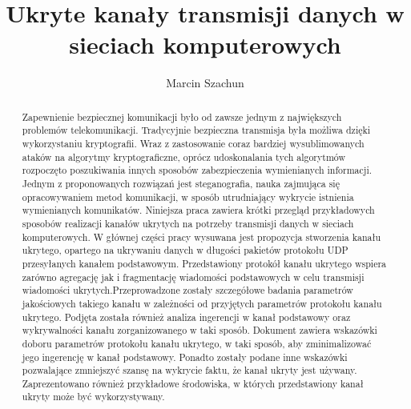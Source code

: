 \documentclass[a4paper, twoside]{report}
\begin{document}
\title{Ukryte kanały transmisji danych w sieciach komputerowych}
\author{Marcin Szachun}
\maketitle


\begin{abstract}
    Zapewnienie bezpiecznej komunikacji było od zawsze jednym z największych
    problemów telekomunikacji. Tradycyjnie bezpieczna transmisja była możliwa
    dzięki wykorzystaniu kryptografii. Wraz z zastosowanie coraz bardziej wysublimowanych
    ataków na algorytmy kryptograficzne, oprócz udoskonalania tych algorytmów rozpoczęto
    poszukiwania innych sposobów zabezpieczenia wymienianych informacji. Jednym
    z proponowanych rozwiązań jest steganografia, nauka zajmująca się opracowywaniem
    metod komunikacji, w sposób utrudniający wykrycie istnienia wymienianych komunikatów.
    Niniejsza praca zawiera krótki przegląd przykładowych sposobów
    realizacji kanałów ukrytych na potrzeby transmisji danych w sieciach komputerowych.
    W głównej części pracy wysuwana jest propozycja stworzenia kanału ukrytego, opartego na ukrywaniu
    danych w długości pakietów protokołu UDP przesyłanych kanałem podstawowym.
    Przedstawiony protokół kanału ukrytego wspiera zarówno agregację jak i fragmentację
    wiadomości podstawowych w celu transmisji wiadomości ukrytych.Przeprowadzone
    zostały szczegółowe badania parametrów jakościowych takiego kanału w zależności
    od przyjętych parametrów protokołu kanału ukrytego. Podjęta została również
    analiza ingerencji w kanał podstawowy oraz wykrywalności kanału zorganizowanego w taki sposób.
    Dokument zawiera wskazówki doboru parametrów protokołu kanału ukrytego, w taki sposób, aby
    zminimalizować jego ingerencję w kanał podstawowy. Ponadto zostały podane inne
    wskazówki pozwalające zmniejszyć szansę na wykrycie faktu, że kanał ukryty jest
    używany. Zaprezentowano również przykładowe środowiska, w których przedstawiony
    kanał ukryty może być wykorzystywany.
\end{abstract}

\tableofcontents

\listoffigures
\end{document}
